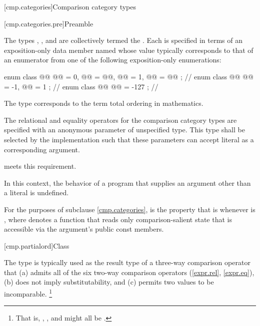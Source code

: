 [cmp.categories]{Comparison category types}

[cmp.categories.pre]{Preamble}

\pnum
The types
,
, and
are collectively termed the .
Each is specified in terms of an exposition-only data member named 
whose value typically corresponds to that of an enumerator
from one of the following exposition-only enumerations:

\begin{codeblock}
enum class @@ { @@ = 0, @@ = @@,
                @@ = 1, @@ = @@ };   // \expos
enum class @@ { @@ = -1, @@ = 1 };                  // \expos
enum class @@ { @@ = -127 };                       // \expos
\end{codeblock}

\pnum
\begin{note}
The type 
corresponds to the term
total ordering in mathematics.
\end{note}

\pnum
The relational and equality operators for the comparison category types
are specified with an anonymous parameter of unspecified type.
This type shall be selected by the implementation such that
these parameters can accept literal  as a corresponding argument.
\begin{example}
meets this requirement.
\end{example}
In this context, the behavior of a program that supplies
an argument other than a literal  is undefined.

\pnum
For the purposes of subclause \ref{cmp.categories},
 is the property that  is 
whenever  is ,
where  denotes a function that reads only comparison-salient state
that is accessible via the argument's public const members.

[cmp.partialord]{Class }

\pnum
The  type is typically used
as the result type of a three-way comparison operator
that (a) admits all of the six two-way comparison operators (\ref{expr.rel}, \ref{expr.eq}),
(b) does not imply substitutability,
and (c) permits two values to be incomparable.%
\footnote{That is, , , and  might all be .}

